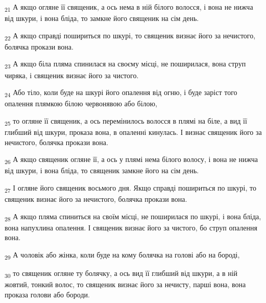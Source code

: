 \begin{tcolorbox}
\textsubscript{21} А якщо огляне її священик, а ось нема в ній білого волосся, і вона не нижча від шкури, і вона бліда, то замкне його священик на сім день.
\end{tcolorbox}
\begin{tcolorbox}
\textsubscript{22} А якщо справді пошириться по шкурі, то священик визнає його за нечистого, болячка прокази вона.
\end{tcolorbox}
\begin{tcolorbox}
\textsubscript{23} А якщо біла пляма спинилася на своєму місці, не поширилася, вона струп чиряка, і священик визнає його за чистого.
\end{tcolorbox}
\begin{tcolorbox}
\textsubscript{24} Або тіло, коли буде на шкурі його опалення від огню, і буде заріст того опалення плямкою білою червонявою або білою,
\end{tcolorbox}
\begin{tcolorbox}
\textsubscript{25} то огляне її священик, а ось перемінилось волосся в плямі на біле, а вид її глибший від шкури, проказа вона, в опаленні кинулась. І визнає священик його за нечистого, болячка прокази вона.
\end{tcolorbox}
\begin{tcolorbox}
\textsubscript{26} А якщо священик огляне її, а ось у плямі нема білого волосу, і вона не нижча від шкури, і вона бліда, то священик замкне його на сім день.
\end{tcolorbox}
\begin{tcolorbox}
\textsubscript{27} І огляне його священик восьмого дня. Якщо справді пошириться по шкурі, то священик визнає його за нечистого, болячка прокази вона.
\end{tcolorbox}
\begin{tcolorbox}
\textsubscript{28} А якщо пляма спиниться на своїм місці, не поширилася по шкурі, і вона бліда, вона напухлина опалення. І священик визнає його за чистого, бо струп опалення вона.
\end{tcolorbox}
\begin{tcolorbox}
\textsubscript{29} А чоловік або жінка, коли буде на кому болячка на голові або на бороді,
\end{tcolorbox}
\begin{tcolorbox}
\textsubscript{30} то священик огляне ту болячку, а ось вид її глибший від шкури, а в ній жовтий, тонкий волос, то священик визнає його за нечисту, парші вона, вона проказа голови або бороди.
\end{tcolorbox}
